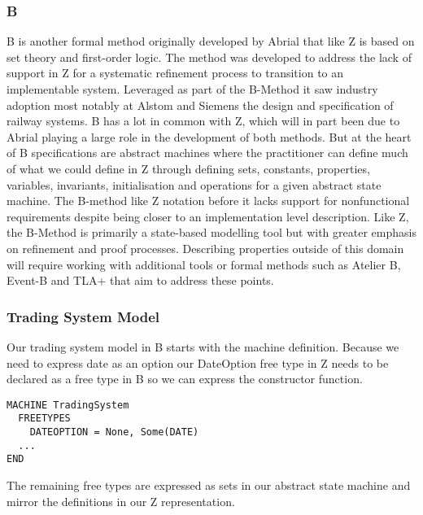 \documentclass{article}
\begin{document}
\subsubsection*{B}

B is another formal method originally developed by Abrial that like Z is based on set theory and first-order logic. The method was developed to address the lack of support in Z for a systematic refinement process to transition to an implementable system. Leveraged as part of the B-Method it saw industry adoption most notably at Alstom and Siemens the design and specification of railway systems.  
\newline \newline
B has a lot in common with Z, which will in part been due to Abrial playing a large role in the development of both methods. But at the heart of B specifications are abstract machines where the practitioner can define much of what we could define in Z through defining sets, constants, properties, variables, invariants, initialisation and operations for a given abstract state machine.
\newline \newline
The B-method like Z notation before it lacks support for nonfunctional requirements despite being closer to an implementation level description. Like Z, the B-Method is primarily a state-based modelling tool but with greater emphasis on refinement and proof processes. Describing properties outside of this domain will require working with additional tools or formal methods such as Atelier B, Event-B and TLA+ that aim to address these points.

\subsubsection*{Trading System Model}

Our trading system model in B starts with the machine definition. Because we need to express date as an option our DateOption free type in Z needs to be declared as a free type in B so we can express the constructor function.
\begin{verbatim}
MACHINE TradingSystem
  FREETYPES
    DATEOPTION = None, Some(DATE)
  ...
END
\end{verbatim}

\hspace{-0.7cm} The remaining free types are expressed as sets in our abstract state machine and mirror the definitions in our Z representation.
\end{document}
